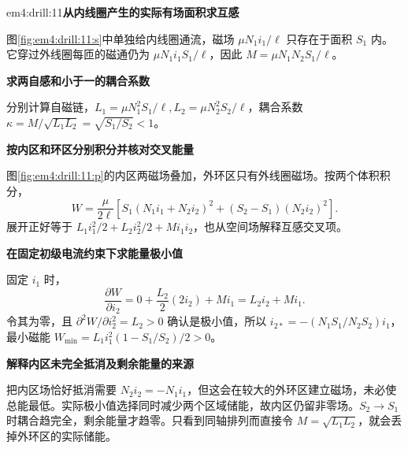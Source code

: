 \begin{drillsolution}{em4:drill:11}\textbf{从内线圈产生的实际有场面积求互感}\par\nobreak
图\ref{fig:em4:drill:11:s}中单独给内线圈通流，磁场 $\mu N_1i_1/\ell$ 只存在于面积 $S_1$ 内。它穿过外线圈每匝的磁通仍为 $\mu N_1i_1S_1/\ell$，因此 $M=\mu N_1N_2S_1/\ell$。

\par\medskip{}\noindent\textbf{求两自感和小于一的耦合系数}\par\nobreak
分别计算自磁链，$L_1=\mu N_1^2S_1/\ell,L_2=\mu N_2^2S_2/\ell$，耦合系数 $\kappa=M/\sqrt{L_1L_2}=\sqrt{S_1/S_2}<1$。



\par\medskip{}\noindent\textbf{按内区和环区分别积分并核对交叉能量}\par\nobreak
图\ref{fig:em4:drill:11:p}的内区两磁场叠加，外环区只有外线圈磁场。按两个体积积分，
\[W=\frac{\mu}{2\ell}\left[S_1(N_1i_1+N_2i_2)^2+(S_2-S_1)(N_2i_2)^2\right].\]
展开正好等于 $L_1i_1^2/2+L_2i_2^2/2+Mi_1i_2$，也从空间场解释互感交叉项。

\par\medskip{}\noindent\textbf{在固定初级电流约束下求能量极小值}\par\nobreak
固定 $i_1$ 时，
\[
\frac{\partial W}{\partial i_2}
=0+\frac{L_2}{2}(2i_2)+Mi_1=L_2i_2+Mi_1.
\]
令其为零，且 $\partial^2W/\partial i_2^2=L_2>0$ 确认是极小值，所以 $i_{2*}=-(N_1S_1/N_2S_2)i_1$，最小磁能 $W_{\min}=L_1i_1^2(1-S_1/S_2)/2>0$。



\par\medskip{}\noindent\textbf{解释内区未完全抵消及剩余能量的来源}\par\nobreak
把内区场恰好抵消需要 $N_2i_2=-N_1i_1$，但这会在较大的外环区建立磁场，未必使总能最低。实际极小值选择同时减少两个区域储能，故内区仍留非零场。$S_2\to S_1$ 时耦合趋完全，剩余能量才趋零。只看到同轴排列而直接令 $M=\sqrt{L_1L_2}$，就会丢掉外环区的实际储能。\end{drillsolution}
